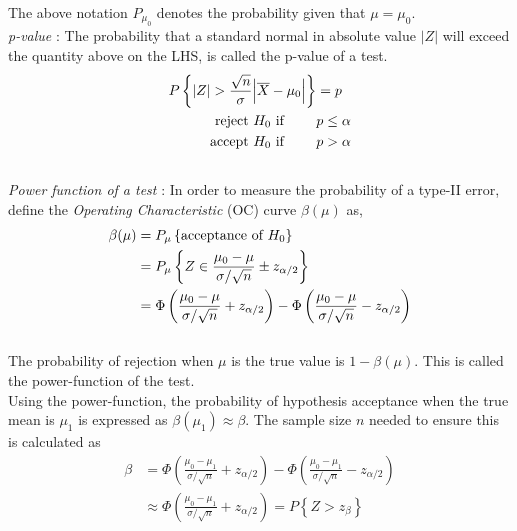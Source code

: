 The above notation $ P_{\mu_0} $ denotes the probability given that $ \mu = \mu_0 $. \\

\textit{p-value} : The probability that a standard normal in absolute value $ |Z| $ will exceed the quantity above on the LHS, is called the p-value of a test. \\
\begin{align}
	P \left\{ |Z| > \frac{\sqrt{n}}{\sigma} \Big| \overline{X} - \mu_0 \Big| \right\} &= p \\
	\text{reject $ H_0 $ if } \qquad & p \leq \alpha \\
	\text{accept $ H_0 $ if } \qquad & p > \alpha	
\end{align} \\

\textit{Power function of a test} : In order to measure the probability of a type-II error, define the \textit{Operating Characteristic} (OC) curve $ \beta(\mu) $ as,\\

\begin{align}
	\beta(\mu) &= P_{\mu} \left\{\text{acceptance of $ H_0 $}\right\} \\
	&= P_{\mu} \left\{ Z \in \frac{\mu_0 - \mu}{\sigma/\sqrt{n}} \pm z_{\alpha/2} \right\} \nonumber \\
	&= \Phi\left(\frac{\mu_0 - \mu}{\sigma/\sqrt{n}} + z_{\alpha/2}\right) - \Phi\left( \frac{\mu_0 - \mu}{\sigma/\sqrt{n}} - z_{\alpha/2} \right)
\end{align}\\

The probability of rejection when $ \mu $ is the true value is $ 1 - \beta(\mu) $. This is called the power-function of the test. \\

Using the power-function, the probability of hypothesis acceptance when the true mean is $ \mu_1 $ is expressed as $ \beta(\mu_1) \approx \beta $. The sample size $ n $ needed to ensure this is calculated as\\

\begin{align}
	\beta &= \Phi\left(\frac{\mu_0 - \mu_1}{\sigma/\sqrt{n}} + z_{\alpha/2}\right) - \Phi\left( \frac{\mu_0 - \mu_1}{\sigma/\sqrt{n}} - z_{\alpha/2} \right) \nonumber \\
	&\approx \Phi\left(\frac{\mu_0 - \mu_1}{\sigma/\sqrt{n}} + z_{\alpha/2}\right) = P\left\{Z > z_\beta\right\}\nonumber
\end{align}\\

